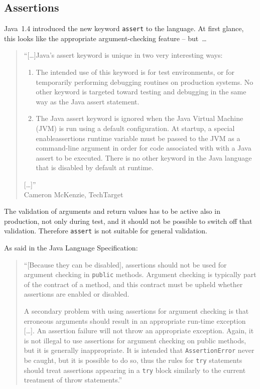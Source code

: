\documentclass[11pt,a4paper, titlepage, parskip=half, headsepline, footsepline, cleardoublepage=current, headheight=1cm]{scrbook}
\begin{document}

\subsection{Assertions}\label{sec:Assertions}
Java~1.4 introduced the new keyword \lstinline|assert|\autocite{ORACLE_DOC_LANGUAGE_SPECIFICATION:Assert} to the language. At first glance, this looks like the appropriate argument-checking feature – but~… 
\begin{quote}
“[…]Java's assert keyword is unique in two very interesting ways:

\begin{enumerate}
\item{The intended use of this keyword is for test environments, or for temporarily performing debugging routines on production systems. No other keyword is targeted toward testing and debugging in the same way as the Java assert statement.}
\item{The Java assert keyword is ignored when the Java Virtual Machine (JVM) is run using a default configuration. At startup, a special enableassertions runtime variable must be passed to the JVM as a command-line argument in order for code associated with with a Java assert to be executed. There is no other keyword in the Java language that is disabled by default at runtime.}
\end{enumerate}
[…]”\\ Cameron McKenzie, TechTarget\autocite{SERVERSIDE:JavaAssert}
\end{quote}

The validation of arguments and return values has to be active also in production, not only during test, and it should not be possible to switch off that validation. Therefore \lstinline|assert| is not suitable for general validation. 

As said in the Java Language Specification\autocite{ORACLE_DOC_LANGUAGE_SPECIFICATION:Assert}:
\begin{quote}
“[Because they can be disabled], assertions should not be used for argument checking in \lstinline|public| methods. Argument checking is typically part of the contract of a method, and this contract must be upheld whether assertions are enabled or disabled.

A secondary problem with using assertions for argument checking is that erroneous arguments should result in an appropriate run-time exception […]. An assertion failure will not throw an appropriate exception. Again, it is not illegal to use assertions for argument checking on public methods, but it is generally inappropriate. It is intended that \lstinline|AssertionError| never be caught, but it is possible to do so, thus the rules for \lstinline|try| statements should treat assertions appearing in a \lstinline|try| block similarly to the current treatment of throw statements.”
\end{quote}
\end{document}
